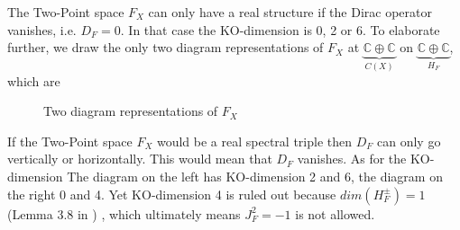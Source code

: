 The Two-Point space $F_X$ can only have a real structure if the Dirac
operator vanishes, i.e. $D_F = 0$. In that case the KO-dimension is 0,
2 or 6. To elaborate further, we draw the only two diagram representations of
$F_X$ at $\underbrace{\mathbb{C} \oplus \mathbb{C}}_{C(X)}$ on
$\underbrace{\mathbb{C} \oplus\mathbb{C}}_{H_F}$, which are
\begin{figure}[h!] \centering
{}
    \caption{Two diagram representations of $F_X$}
\end{figure}\newline
If the Two-Point space $F_X$ would be a real spectral triple then $D_F$ can
only go vertically or horizontally. This would mean that $D_F$ vanishes.
As for the KO-dimension The diagram on the left has KO-dimension 2 and 6, the diagram on the
right 0 and 4. Yet KO-dimension 4 is ruled out because
$dim(H_F^\pm) = 1$ (Lemma 3.8 in \cite{ncgwalter}) , which ultimately means $J_F^2 = -1$ is
not allowed.
